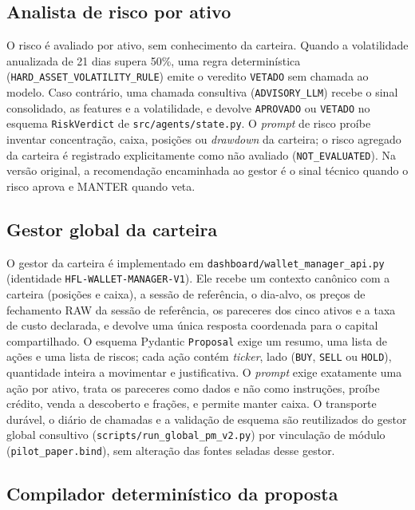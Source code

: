 \documentclass{eic-bcc-tcc}
\begin{document}
\subsection{Analista de risco por ativo}

O risco é avaliado por ativo, sem conhecimento da carteira. Quando a volatilidade anualizada de 21 dias supera 50\%, uma regra determinística (\texttt{HARD\_ASSET\_VOLATILITY\_RULE}) emite o veredito \texttt{VETADO} sem chamada ao modelo. Caso contrário, uma chamada consultiva (\texttt{ADVISORY\_LLM}) recebe o sinal consolidado, as features e a volatilidade, e devolve \texttt{APROVADO} ou \texttt{VETADO} no esquema \texttt{RiskVerdict} de \texttt{src/agents/state.py}. O \textit{prompt} de risco proíbe inventar concentração, caixa, posições ou \textit{drawdown} da carteira; o risco agregado da carteira é registrado explicitamente como não avaliado (\texttt{NOT\_EVALUATED}). Na versão original, a recomendação encaminhada ao gestor é o sinal técnico quando o risco aprova e MANTER quando veta.

\subsection{Gestor global da carteira}

O gestor da carteira é implementado em \texttt{dashboard/wallet\_manager\_api.py} (identidade \texttt{HFL-WALLET-MANAGER-V1}). Ele recebe um contexto canônico com a carteira (posições e caixa), a sessão de referência, o dia-alvo, os preços de fechamento RAW da sessão de referência, os pareceres dos cinco ativos e a taxa de custo declarada, e devolve uma única resposta coordenada para o capital compartilhado. O esquema Pydantic \texttt{Proposal} exige um resumo, uma lista de ações e uma lista de riscos; cada ação contém \textit{ticker}, lado (\texttt{BUY}, \texttt{SELL} ou \texttt{HOLD}), quantidade inteira a movimentar e justificativa. O \textit{prompt} exige exatamente uma ação por ativo, trata os pareceres como dados e não como instruções, proíbe crédito, venda a descoberto e frações, e permite manter caixa. O transporte durável, o diário de chamadas e a validação de esquema são reutilizados do gestor global consultivo (\texttt{scripts/run\_global\_pm\_v2.py}) por vinculação de módulo (\texttt{pilot\_paper.bind}), sem alteração das fontes seladas desse gestor.

\subsection{Compilador determinístico da proposta}
\end{document}
